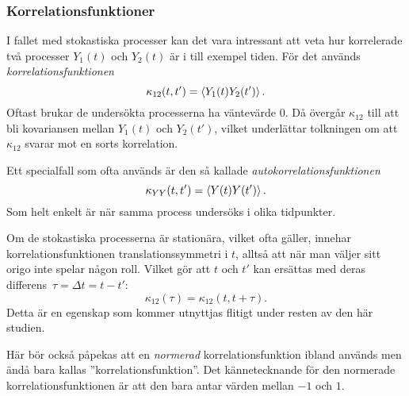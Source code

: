 \subsubsection{Korrelationsfunktioner}
I fallet med stokastiska processer kan det vara intressant att veta
hur korrelerade två processer $Y_1(t)$ och $Y_2(t)$ är i till exempel tiden. För det används \emph{korrelationsfunktionen}
\begin{equation}\label{eq:corr}
\kappa_{12}(t, t') = \ev{Y_1(t)Y_2(t')}.
\end{equation}
Oftast brukar de undersökta processerna ha väntevärde $0$. Då övergår $\kappa_{12}$ till att bli kovariansen mellan $Y_1(t)$ och $Y_2(t')$, vilket underlättar tolkningen om att $\kappa_{12}$ svarar mot en sorts korrelation. 

Ett specialfall som ofta används är den så kallade \emph{autokorrelationsfunktionen}
\begin{equation}\label{eq:autocorr}
\kappa_{YY}(t, t') = \ev{Y(t)Y(t')}.
\end{equation}
Som helt enkelt är när samma process undersöks i olika tidpunkter. 

Om de stokastiska processerna är stationära, vilket ofta gäller, innehar korrelationsfunktionen translationssymmetri i $t$, alltså att när man väljer sitt origo inte spelar någon roll. Vilket gör att $t$ och $t'$ kan ersättas med deras differens~$\tau=\Delta t= t-t'$:
\begin{equation}
\kappa_{12}(\tau) = \kappa_{12}(t, t+\tau).
\end{equation}
Detta är en egenskap som kommer utnyttjas flitigt under resten av den här studien.

Här bör också påpekas att en \emph{normerad} korrelationsfunktion ibland används men ändå bara kallas ''korrelationsfunktion''. Det kännetecknande för den normerade korrelationsfunktionen är att den bara antar värden mellan $-1$ och $1$.

